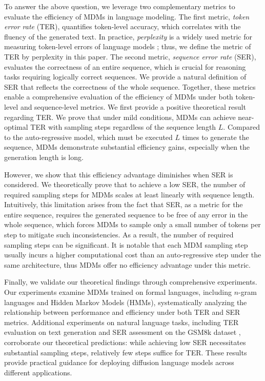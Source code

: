 To answer the above question, we leverage two complementary metrics to evaluate the efficiency of MDMs in language modeling. The first metric, \textit{token error rate} (TER), quantifies token-level accuracy, which correlates with the fluency of the generated text. In practice, \textit{perplexity} is a widely used metric for measuring token-level errors of language models \citep{jelinek1977perplexity,Devlin2019BERT}; thus, we define the metric of TER by perplexity in this paper. The second metric, \textit{sequence error rate} (SER), evaluates the correctness of an entire sequence, which is crucial for reasoning tasks requiring logically correct sequences. We provide a natural definition of SER that reflects the correctness of the whole sequence. Together, these metrics enable a comprehensive evaluation of the efficiency of MDMs under both token-level and sequence-level metrics. We first provide a positive theoretical result regarding TER. We prove that under mild conditions, MDMs can achieve near-optimal TER with sampling steps regardless of the sequence length $L$. Compared to the auto-regressive model, which must be executed $L$ times to generate the sequence, MDMs demonstrate substantial efficiency gains, especially when the generation length is long.


However, we show that this efficiency advantage diminishes when SER is considered. We theoretically prove that to achieve a low SER, the number of required sampling steps for MDMs scales at least linearly with sequence length. Intuitively, this limitation arises from the fact that SER, as a metric for the entire sequence, requires the generated sequence to be free of any error in the whole sequence, which forces MDMs to sample only a small number of tokens per step to mitigate such inconsistencies. As a result, the number of required sampling steps can be significant. It is notable that each MDM sampling step usually incurs a higher computational cost than an auto-regressive step under the same architecture, thus MDMs offer no efficiency advantage under this metric. 




Finally, we validate our theoretical findings through comprehensive experiments. Our experiments examine MDMs trained on formal languages, including $n$-gram languages and Hidden Markov Models (HMMs), systematically analyzing the relationship between performance and efficiency under both TER and SER metrics. Additional experiments on natural language tasks, including TER evaluation on text generation and SER assessment on the GSM8k dataset \citep{cobbe2021gsm8k}, corroborate our theoretical predictions: while achieving low SER necessitates substantial sampling steps, relatively few steps suffice for TER. These results provide practical guidance for deploying diffusion language models across different applications.

